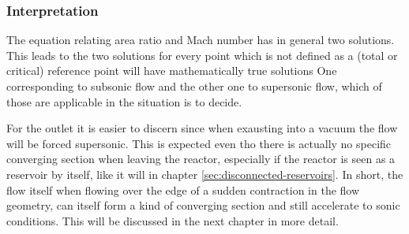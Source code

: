 \subsubsection*{Interpretation}
	The equation relating area ratio and Mach number has in general two solutions.
	This leads to the two solutions for every point which is not defined as a (total or critical) reference point will have mathematically true solutions
	One corresponding to subsonic flow and the other one to supersonic flow, which of those are applicable in the situation is to decide.

	For the outlet it is easier to discern since when exausting into a vacuum the flow will be forced supersonic.
	This is expected even tho there is actually no specific converging section when leaving the reactor, especially if the reactor is seen as a reservoir by itself, like it will in chapter \ref{sec:disconnected-reservoirs}.
	In short, the flow itself when flowing over the edge of a sudden contraction in the flow geometry, can itself form a kind of converging section and still accelerate to sonic conditions.
	This will be discussed in the next chapter in more detail.
